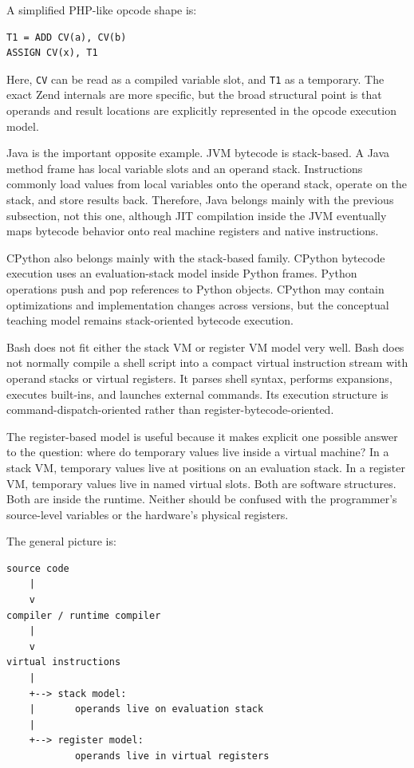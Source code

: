 \documentclass[a4paper,twoside]{report}
\begin{document}
A simplified PHP-like opcode shape is:

\begin{verbatim}
T1 = ADD CV(a), CV(b)
ASSIGN CV(x), T1
\end{verbatim}

Here, \texttt{CV} can be read as a compiled variable slot, and \texttt{T1} as a temporary. The exact Zend internals are more specific, but the broad structural point is that operands and result locations are explicitly represented in the opcode execution model.

Java is the important opposite example. JVM bytecode is stack-based. A Java method frame has local variable slots and an operand stack. Instructions commonly load values from local variables onto the operand stack, operate on the stack, and store results back. Therefore, Java belongs mainly with the previous subsection, not this one, although JIT compilation inside the JVM eventually maps bytecode behavior onto real machine registers and native instructions.

CPython also belongs mainly with the stack-based family. CPython bytecode execution uses an evaluation-stack model inside Python frames. Python operations push and pop references to Python objects. CPython may contain optimizations and implementation changes across versions, but the conceptual teaching model remains stack-oriented bytecode execution.

Bash does not fit either the stack VM or register VM model very well. Bash does not normally compile a shell script into a compact virtual instruction stream with operand stacks or virtual registers. It parses shell syntax, performs expansions, executes built-ins, and launches external commands. Its execution structure is command-dispatch-oriented rather than register-bytecode-oriented.

The register-based model is useful because it makes explicit one possible answer to the question: where do temporary values live inside a virtual machine? In a stack VM, temporary values live at positions on an evaluation stack. In a register VM, temporary values live in named virtual slots. Both are software structures. Both are inside the runtime. Neither should be confused with the programmer's source-level variables or the hardware's physical registers.

The general picture is:

\begin{verbatim}
source code
    |
    v
compiler / runtime compiler
    |
    v
virtual instructions
    |
    +--> stack model:
    |       operands live on evaluation stack
    |
    +--> register model:
            operands live in virtual registers
\end{verbatim}
\end{document}
